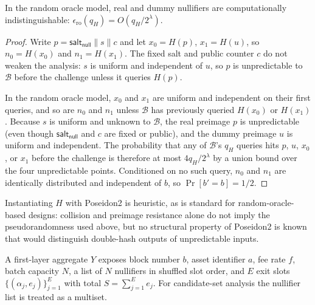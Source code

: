 \documentclass{iacrcc}
\begin{document}
\begin{theorem}
\label{thm:nullifier-indist}
In the random oracle model, real and dummy nullifiers are computationally indistinguishable: \(\epsilon_{\mathrm{ro}}(q_H) = O(q_H / 2^{\lambda})\).
\end{theorem}

\begin{proof}
Write \(p = \mathsf{salt_{null}} \parallel s \parallel c\) and let \(x_0 = H(p)\), \(x_1 = H(u)\), so \(n_0 = H(x_0)\) and \(n_1 = H(x_1)\). The fixed salt and public counter \(c\) do not weaken the analysis: \(s\) is uniform and independent of \(u\), so \(p\) is unpredictable to \(\mathcal{B}\) before the challenge unless it queries \(H(p)\).

In the random oracle model, \(x_0\) and \(x_1\) are uniform and independent on their first queries, and so are \(n_0\) and \(n_1\) unless \(\mathcal{B}\) has previously queried \(H(x_0)\) or \(H(x_1)\). Because \(s\) is uniform and unknown to \(\mathcal{B}\), the real preimage \(p\) is unpredictable (even though \(\mathsf{salt_{null}}\) and \(c\) are fixed or public), and the dummy preimage \(u\) is uniform and independent. The probability that any of \(\mathcal{B}\)'s \(q_H\) queries hits \(p\), \(u\), \(x_0\), or \(x_1\) before the challenge is therefore at most \(4 q_H / 2^{\lambda}\) by a union bound over the four unpredictable points. Conditioned on no such query, \(n_0\) and \(n_1\) are identically distributed and independent of \(b\), so \(\Pr[b' = b] = 1/2\).
\end{proof}

Instantiating \(H\) with Poseidon2 is heuristic, as is standard for random-oracle-based designs: collision and preimage resistance alone do not imply the pseudorandomness used above, but no structural property of Poseidon2 is known that would distinguish double-hash outputs of unpredictable inputs.

\begin{definition}
\label{def:aggregate-view}
A first-layer aggregate \(Y\) exposes block number \(b\), asset identifier \(a\), fee rate \(f\), batch capacity \(N\), a list of \(N\) nullifiers in shuffled slot order, and \(E\) exit slots \(\{(\alpha_j, e_j)\}_{j=1}^{E}\) with total \(S = \sum_{j=1}^{E} e_j\). For candidate-set analysis the nullifier list is treated as a multiset.
\end{definition}
\end{document}
